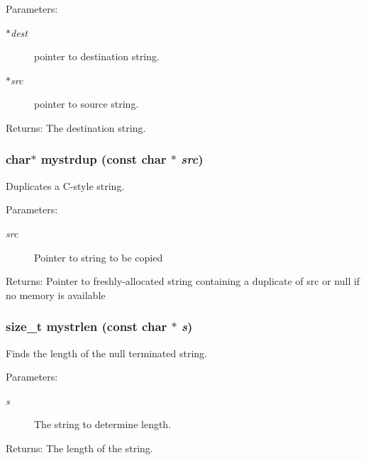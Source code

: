 \begin{Desc}
\item[Parameters:]
\begin{description}
\item[{\em $\ast$dest}]pointer to destination string. \item[{\em $\ast$src}]pointer to source string. \end{description}
\end{Desc}
\begin{Desc}
\item[Returns:]The destination string. \end{Desc}
\subsubsection{\setlength{\rightskip}{0pt plus 5cm}char$\ast$ mystrdup (const char $\ast$ {\em src})}\label{mystring_8h_148a52c665d88f52fb4995338a319d3c}


Duplicates a C-style string. \begin{Desc}
\item[Parameters:]
\begin{description}
\item[{\em src}]Pointer to string to be copied \end{description}
\end{Desc}
\begin{Desc}
\item[Returns:]Pointer to freshly-allocated string containing a duplicate of src or null if no memory is available \end{Desc}
\subsubsection{\setlength{\rightskip}{0pt plus 5cm}size\_\-t mystrlen (const char $\ast$ {\em s})}\label{mystring_8h_a231246d7f6f97231aa18689cc2ea20a}


Finds the length of the null terminated string. 

\begin{Desc}
\item[Parameters:]
\begin{description}
\item[{\em s}]The string to determine length. \end{description}
\end{Desc}
\begin{Desc}
\item[Returns:]The length of the string. \end{Desc}
